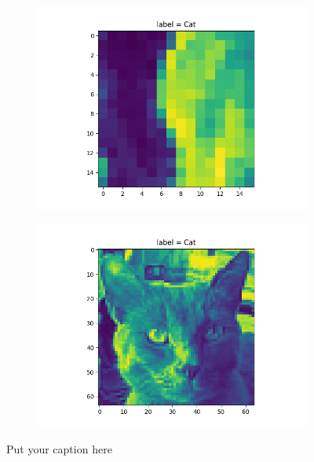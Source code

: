 \documentclass{article}
\begin{document}
\begin{figure}[H]
\begin{subfigure}{.5\textwidth}
  \centering
  \includegraphics[width=1\linewidth]{2b/box num 8.png}  
  
  \label{fig:sub-first}
\end{subfigure}
\begin{subfigure}{.5\textwidth}
  \centering
  \includegraphics[width=1\linewidth]{2b/example pic.png}  
  
  \label{fig:sub-first}
\end{subfigure}

\caption{Put your caption here}
\label{BOXES}
\end{figure}
\end{document}
